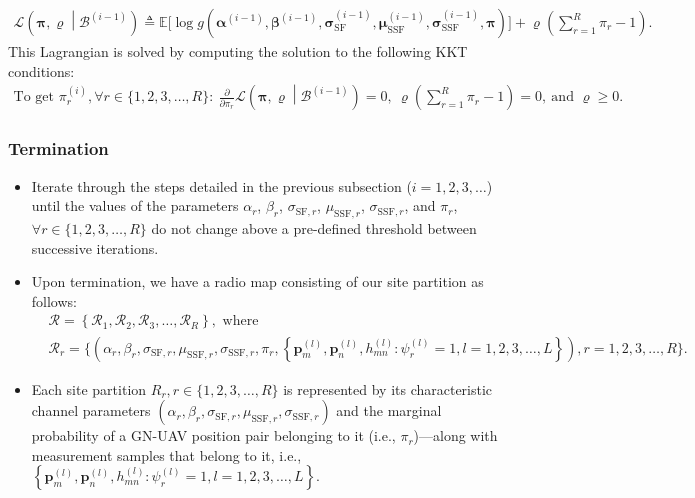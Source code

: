 \documentclass{article}
\begin{document}
\begin{itemize}
    \begin{align}\label{Pi_lagrangian}
        \mathcal{L}\left(\mathbf{\pi},\varrho\middle|\mathcal{B}^{(i{-}1)}\right){\triangleq}\mathbb{E}\Bigg[\log g\left(\boldsymbol{\alpha}^{(i{-}1)},\boldsymbol{\beta}^{(i{-}1)},\boldsymbol{\sigma}_{\mathrm{SF}}^{(i{-}1)},\boldsymbol{\mu}_{\mathrm{SSF}}^{(i{-}1)},\boldsymbol{\sigma}_{\mathrm{SSF}}^{(i{-}1)},\boldsymbol{\pi}\right)\Bigg]{+}\varrho\left(\sum_{r{=}1}^{R}\pi_{r}{-}1\right).
    \end{align}
    This Lagrangian is solved by computing the solution to the following KKT conditions:
    \begin{align}
        \text{To get }\pi_{r}^{(i)},{\forall}r{\in}\{1,2,3,{\dots},R\}:\ \frac{\partial}{\partial\pi_{r}}\mathcal{L}\left(\mathbf{\pi},\varrho\middle|\mathcal{B}^{(i{-}1)}\right){=}0,\ \varrho\left(\sum_{r{=}1}^{R}\pi_{r}{-}1\right){=}0,\ \text{and }\varrho{\geq}0.\nonumber
    \end{align}
\end{itemize}

\subsubsection{Termination}
\begin{itemize}
    \item Iterate through the steps detailed in the previous subsection ($i{=}1,2,3,{\dots}$) until the values of the parameters $\alpha_{r}$, $\beta_{r}$, $\sigma_{\mathrm{SF},r}$, $\mu_{\mathrm{SSF},r}$, $\sigma_{\mathrm{SSF},r}$, and $\pi_{r}$, ${\forall}r{\in}\{1,2,3,{\dots},R\}$ do not change above a pre-defined threshold between successive iterations.
    \item Upon termination, we have a radio map consisting of our site partition as follows:
    \begin{align}\label{Partition_summary}
        &\mathcal{R}{=}\left\{\mathcal{R}_{1},\mathcal{R}_{2},\mathcal{R}_{3},{\dots},\mathcal{R}_{R}\right\},\text{ where}\\&\mathcal{R}_{r}{=}\Bigg\{\left(\alpha_{r},\beta_{r},\sigma_{\mathrm{SF},r},\mu_{\mathrm{SSF},r},\sigma_{\mathrm{SSF},r},\pi_{r},\left\{\mathbf{p}_{m}^{(l)},\mathbf{p}_{n}^{(l)},h_{mn}^{(l)}:\psi_{r}^{(l)}{=}1,l{=}1,2,3,{\dots},L\right\}\right),r{=}1,2,3,{\dots},R\Bigg\}.\nonumber
    \end{align}
    \item Each site partition $R_{r},r{\in}\{1,2,3,{\dots},R\}$ is represented by its characteristic channel parameters $\left(\alpha_{r},\beta_{r},\sigma_{\mathrm{SF},r},\mu_{\mathrm{SSF},r},\sigma_{\mathrm{SSF},r}\right)$ and the marginal probability of a GN-UAV position pair belonging to it (i.e., $\pi_{r}$)---along with measurement samples that belong to it, i.e., $\left\{\mathbf{p}_{m}^{(l)},\mathbf{p}_{n}^{(l)},h_{mn}^{(l)}:\psi_{r}^{(l)}{=}1,l{=}1,2,3,{\dots},L\right\}$.
\end{itemize}
\end{document}
